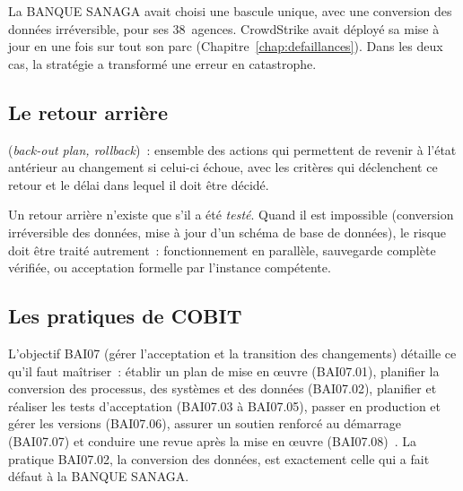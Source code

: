 La BANQUE SANAGA avait choisi une bascule unique, avec une conversion des
données irréversible, pour ses 38~agences. CrowdStrike avait déployé sa
mise à jour en une fois sur tout son parc (Chapitre~\ref{chap:defaillances}).
Dans les deux cas, la stratégie a transformé une erreur en catastrophe.

\subsection{Le retour arrière}

\begin{boxdef}
 (\textit{back-out
plan, rollback})~: ensemble des actions qui permettent de revenir à l'état
antérieur au changement si celui-ci échoue, avec les critères qui
déclenchent ce retour et le délai dans lequel il doit être décidé.
\end{boxdef}

Un retour arrière n'existe que s'il a été \emph{testé}. Quand il est
impossible (conversion irréversible des données, mise à jour d'un
schéma de base de données), le risque doit être traité autrement~:
fonctionnement en parallèle, sauvegarde complète vérifiée, ou acceptation
formelle par l'instance compétente.

\subsection{Les pratiques de COBIT}

L'objectif BAI07 (gérer l'acceptation et la transition des changements)
détaille ce qu'il faut maîtriser~: établir un plan de mise en œuvre
(BAI07.01), planifier la conversion des processus, des systèmes et des
données (BAI07.02), planifier et réaliser les tests d'acceptation
(BAI07.03 à BAI07.05), passer en production et gérer les versions
(BAI07.06), assurer un soutien renforcé au démarrage (BAI07.07) et
conduire une revue après la mise en œuvre (BAI07.08)~\cite{isaca2018cobitobjectifs}.
La pratique BAI07.02, la conversion des données, est exactement celle qui
a fait défaut à la BANQUE SANAGA.

